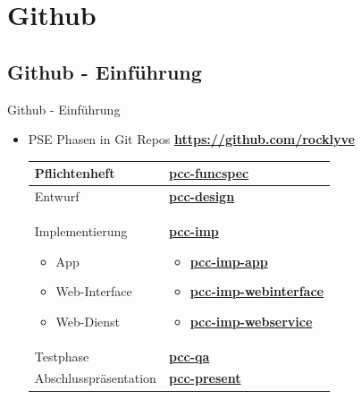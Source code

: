 \documentclass[19pt]{beamer}
\begin{document}

\section{Github}
\subsection{Github - Einf\"{u}hrung}
\begin{frame}{Github - Einf\"{u}hrung}
\begin{itemize}
\item PSE Phasen in Git Repos \textbf{\href{https://github.com/rocklyve}{https://github.com/rocklyve}} \\

    	\begin{tabular}{| p{} | p{} |}
  			\hline			
  			Pflichtenheft & \textbf{\href{https://github.com/rocklyve/pcc-funcspec}{pcc-funcspec}}\\
  			\hline			
  			Entwurf & \textbf{\href{https://github.com/rocklyve/pcc-design}{pcc-design}}\\
  			\hline			
  			Implementierung 
  			\begin{itemize}
				\item App
				\item Web-Interface
				\item Web-Dienst
			\end{itemize} & \textbf{\href{https://github.com/rocklyve/pcc-imp}{pcc-imp}} \begin{itemize}
				\item \textbf{\href{https://github.com/rocklyve/pcc-imp-app}{pcc-imp-app}}
				\item \textbf{\href{https://github.com/rocklyve/pcc-imp-webinterface}{pcc-imp-webinterface}}
				\item \textbf{\href{https://github.com/rocklyve/pcc-imp-webservice}{pcc-imp-webservice}}
			\end{itemize}\\
  			\hline
  			Testphase & \textbf{\href{https://github.com/rocklyve/pcc-qa}{pcc-qa}}\\
  			\hline
  			Abschlusspr\"{a}sentation & \textbf{\href{https://github.com/rocklyve/pcc-present}{pcc-present}}\\
		  	\hline  
		\end{tabular}
	\end{itemize}
\end{frame}
\end{document}
